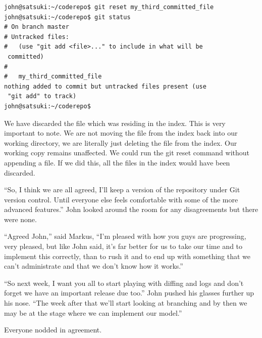 \begin{Verbatim}[frame=leftline,framerule=1mm,fontsize=\relsize{-3}] 
john@satsuki:~/coderepo$ git reset my_third_committed_file
john@satsuki:~/coderepo$ git status
# On branch master
# Untracked files:
#   (use "git add <file>..." to include in what will be 
 committed)
#
#	my_third_committed_file
nothing added to commit but untracked files present (use 
 "git add" to track)
john@satsuki:~/coderepo$ 
\end{Verbatim}

We have discarded the file which was residing in the index.  This is very important to note.  We are not moving the file from the index back into our working directory, we are literally just deleting the file from the index.  Our working copy remains unaffected.  We could run the git reset command without appending a file.  If we did this, all the files in the index would have been discarded.  

\begin{trenches}
``So, I think we are all agreed, I'll keep a version of the repository under Git version control.  Until everyone else feels comfortable with some of the more advanced features.''  John looked around the room for any disagreements but there were none.

``Agreed John,'' said Markus, ``I'm pleased with how you guys are progressing, very pleased, but like John said, it's far better for us to take our time and to implement this correctly, than to rush it and to end up with something that we can't administrate and that we don't know how it works.''

``So next week, I want you all to start playing with diffing and logs and don't forget we have an important release due too.''  John pushed his glasses further up his nose.  ``The week after that we'll start looking at branching and by then we may be at the stage where we can implement our model.''

Everyone nodded in agreement.
\end{trenches}

